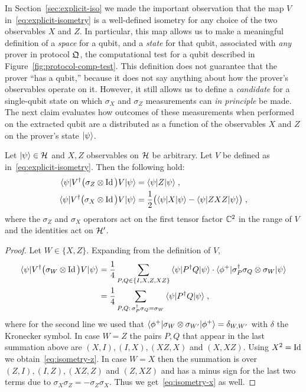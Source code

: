In Section~\ref{sec:explicit-iso} we made the important observation that the map $V$ in~\eqref{eq:explicit-isometry} is a well-defined isometry for any choice of the two observables $X$ and $Z$. In particular, this map allows us to make a meaningful definition of a \emph{space} for a qubit, and a \emph{state} for that qubit, associated with \emph{any} prover in protocol $\mathfrak{Q}$, the computational test for a qubit described in Figure~\ref{fig:protocol-comp-test}. This definition does not guarantee that the prover ``has a qubit,'' because it does not say anything about how the prover's observables operate on it. 
 However, it still allows us to define a \emph{candidate} for a single-qubit state on which $\sigma_X$ and $\sigma_Z$ measurements can \emph{in principle} be made. The next claim evaluates how outcomes of these measurements when performed on the extracted qubit are a distributed as a function of the observables $X$ and $Z$ on the prover's state $|\psi\rangle$. 

\begin{claim}\label{claim:iso-xz}
Let $|\psi\rangle \in \mathcal{H}$ and $X,Z$ observables on $\mathcal{H}$ be arbitrary. Let $V$ be defined as in~\eqref{eq:explicit-isometry}. Then the following hold:
\begin{align}
\langle\psi| V^\dagger \big(\sigma_Z \otimes \mathop{\rm Id}\nolimits\big) V |\psi\rangle &= \langle\psi| Z |\psi\rangle\;,\label{eq:isometry-z}\\
\langle\psi| V^\dagger \big(\sigma_X \otimes \mathop{\rm Id}\nolimits\big) V |\psi\rangle &= \frac{1}{2} \big(  \langle\psi| X |\psi\rangle -  \langle\psi| ZXZ |\psi\rangle \big)\;,\label{eq:isometry-x}
\end{align}
where the $\sigma_Z$ and $\sigma_X$ operators act on the first tensor factor $\mathbb{C}^2$ in the range of $V$ and the identities act on $\mathcal{H}'$. 
\end{claim}

\begin{proof}
Let $W\in\{X,Z\}$. Expanding from the definition of $V$,
\begin{align*}
\langle\psi| V^\dagger \big(\sigma_W \otimes \mathop{\rm Id}\nolimits\big) V |\psi\rangle
&= \frac{1}{4}\sum_{P,Q\in \{I,X,Z,XZ\}} \,\langle\psi| P^\dagger Q |\psi\rangle\cdot \langle\phi^+| \sigma_P^\dagger \sigma_Q \otimes \sigma_W |\psi\rangle\\
&= \frac{1}{4}\sum_{P,Q:\, \sigma_P^\dagger \sigma_Q = \sigma_W} \,\langle\psi| P^\dagger Q |\psi\rangle\;,
\end{align*}
where for the second line we used that $\langle\phi^+| \sigma_W \otimes \sigma_{W'} |\phi^+\rangle = \delta_{W,W'}$ with $\delta$ the Kronecker symbol. In case $W=Z$ the pairs $P,Q$ that appear in the last summation above are $(X,I),(I,X),(XZ,X)$ and $(X,XZ)$. Using $X^2 = \mathop{\rm Id}\nolimits$ we obtain~\eqref{eq:isometry-z}. In case $W=X$ then the summation is over $(Z,I),(I,Z),(XZ,Z)$ and $(Z,XZ)$ and has a minus sign for the last two terms due to $\sigma_X\sigma_Z = -\sigma_Z\sigma_X$. Thus we get~\eqref{eq:isometry-x} as well. 
\end{proof}

